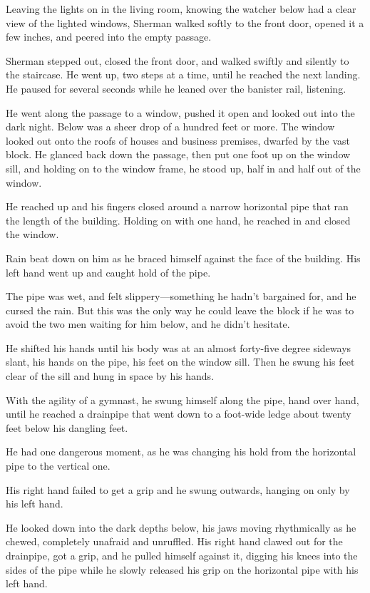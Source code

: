 \documentclass{novel}
\begin{document}
Leaving the lights on in the living room, knowing the watcher below had a clear view of the lighted windows, Sherman walked softly to the front door, opened it a few inches, and peered into the empty passage.

Sherman stepped out, closed the front door, and walked swiftly and silently to the staircase. He went up, two steps at a time, until he reached the next landing. He paused for several seconds while he leaned over the banister rail, listening.

He went along the passage to a window, pushed it open and looked out into the dark night. Below was a sheer drop of a hundred feet or more. The window looked out onto the roofs of houses and business premises, dwarfed by the vast block. He glanced back down the passage, then put one foot up on the window sill, and holding on to the window frame, he stood up, half in and half out of the window.

He reached up and his fingers closed around a narrow horizontal pipe that ran the length of the building. Holding on with one hand, he reached in and closed the window.

Rain beat down on him as he braced himself against the face of the building. His left hand went up and caught hold of the pipe.

The pipe was wet, and felt slippery—something he hadn't bargained for, and he cursed the rain. But this was the only way he could leave the block if he was to avoid the two men waiting for him below, and he didn't hesitate.

He shifted his hands until his body was at an almost forty-five degree sideways slant, his hands on the pipe, his feet on the window sill. Then he swung his feet clear of the sill and hung in space by his hands.

With the agility of a gymnast, he swung himself along the pipe, hand over hand, until he reached a drainpipe that went down to a foot-wide ledge about twenty feet below his dangling feet.

He had one dangerous moment, as he was changing his hold from the horizontal pipe to the vertical one.

His right hand failed to get a grip and he swung outwards, hanging on only by his left hand.

He looked down into the dark depths below, his jaws moving rhythmically as he chewed, completely unafraid and unruffled. His right hand clawed out for the drainpipe, got a grip, and he pulled himself against it, digging his knees into the sides of the pipe while he slowly released his grip on the horizontal pipe with his left hand.
\end{document}
